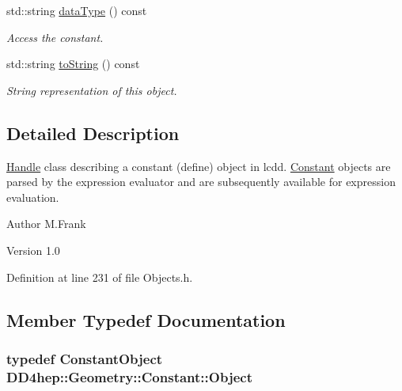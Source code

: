 \begin{DoxyCompactItemize}
std::string \hyperlink{class_d_d4hep_1_1_geometry_1_1_constant_a1cb86176f3a45cc92f2b75025e840ae5}{dataType} () const 
\begin{DoxyCompactList}\small\item\em Access the constant. \item\end{DoxyCompactList}\item 
std::string \hyperlink{class_d_d4hep_1_1_geometry_1_1_constant_a58617a2828ac516c922cc860c8f87de1}{toString} () const 
\begin{DoxyCompactList}\small\item\em String representation of this object. \item\end{DoxyCompactList}\end{DoxyCompactItemize}


\subsection{Detailed Description}
\hyperlink{class_d_d4hep_1_1_handle}{Handle} class describing a constant (define) object in lcdd. \hyperlink{class_d_d4hep_1_1_geometry_1_1_constant}{Constant} objects are parsed by the expression evaluator and are subsequently available for expression evaluation.

\begin{DoxyAuthor}{Author}
M.Frank 
\end{DoxyAuthor}
\begin{DoxyVersion}{Version}
1.0 
\end{DoxyVersion}


Definition at line 231 of file Objects.h.

\subsection{Member Typedef Documentation}
\hypertarget{class_d_d4hep_1_1_geometry_1_1_constant_abff9d4c7bfbabd0f61a46253c4b79e70}{
\subsubsection[{Object}]{\setlength{\rightskip}{0pt plus 5cm}typedef {\bf ConstantObject} {\bf DD4hep::Geometry::Constant::Object}}}
\label{class_d_d4hep_1_1_geometry_1_1_constant_abff9d4c7bfbabd0f61a46253c4b79e70}


